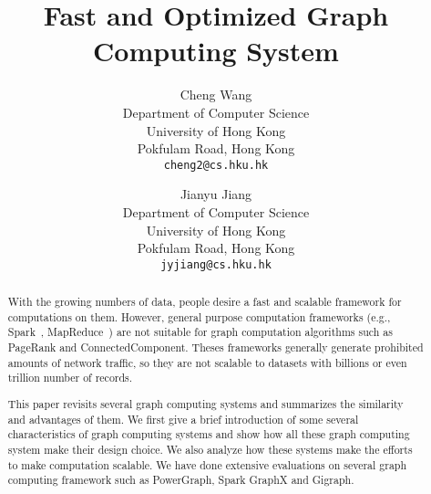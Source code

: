 \documentclass{acm_proc_article}
\newcommand{\eg}[0]{e.g.,}
\begin{document}
%

\title{Fast and Optimized Graph Computing System}
%

\author{
Cheng Wang\\
Department of Computer Science\\
University of Hong Kong\\
Pokfulam Road, Hong Kong\\
\texttt{cheng2@cs.hku.hk}
\and Jianyu Jiang\\
Department of Computer Science\\
University of Hong Kong \\
Pokfulam Road, Hong Kong \\
\texttt{jyjiang@cs.hku.hk}
}


%

\maketitle

\begin{abstract}
With the growing numbers of data, people desire a fast and scalable framework
for computations on them. However, general purpose computation
frameworks (\eg{} Spark~\cite{nsdi12:spark}, MapReduce~\cite{mapreduce})
are not suitable for graph computation algorithms such as PageRank and
ConnectedComponent. Theses frameworks generally generate prohibited amounts
of network traffic, so they are not scalable to datasets with billions or
even trillion number of records.

This paper revisits several graph computing systems and summarizes the similarity
and advantages of them. We first give a
brief introduction of some several characteristics of graph computing
systems and show how all these graph computing system make their design choice.
We also analyze how these systems make the efforts to
make computation scalable. We have done extensive evaluations on several graph
computing framework such as PowerGraph, Spark GraphX and Gigraph.
\end{abstract}
\end{document}
